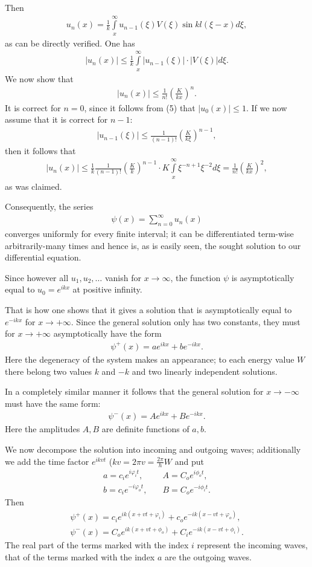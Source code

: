 \documentclass[a4paper,11pt]{article}
\newcommand{\?}[2]{#1\footnote{\textsc{Translator note}: #2}}
\newcommand{\nequ}[2]{\begin{align*}\tag{#1}#2\end{align*}}
\newcommand{\uequ}[1]{\begin{align*}#1\end{align*}}
\renewcommand{\exp}[1]{e^{#1}}
\begin{document}
Then
\uequ{
u_n(x) = \frac{1}{k}\int\limits_x^\infty u_{n-1}(\xi) V(\xi) \sin{kl(\xi - x)}d\xi,
}
as can be directly verified. One has
\uequ{
\left|u_n(x)\right| 
\leq 
\frac{1}{k}\int\limits_x^\infty
\left|u_{n-1}(\xi)\right|
\cdot
\left|V(\xi)\right|d\xi.
}
We now show that 
\uequ{
\left|u_n(x)\right| \leq \frac{1}{n!}\left(\frac{K}{kx}\right)^n.
}
It is correct for $n=0$, since it follows from (5) that $|u_0(x)|\leq 1$. If we now assume that it is correct for $n-1$:
\uequ{
\left|u_{n-1}(\xi)\right| \leq \frac{1}{(n-1)!}\left(\frac{K}{k\xi}\right)^{n-1},
}
then it follows that
\uequ{
\left|u_n(x)\right|\leq\frac{1}{k}\frac{1}{(n-1)!}\left(\frac{K}{k}\right)^{n-1}\cdot K
\int\limits_x^\infty\xi^{-n+1}\xi^{-2}d\xi = \frac{1}{n!}\left(\frac{K}{kx}\right)^2,
}
as was claimed.

Consequently, the series
\nequ{6}{
\psi(x) = \sum\limits_{n=0}^\infty u_n(x)
}
converges uniformly for every finite interval; it can be differentiated term-wise arbitrarily-many times and hence is, as is easily seen, the sought solution to our differential equation.

Since however all $u_1, u_2, \dots$ vanish for $x\to\infty$, the function $\psi$ is asymptotically equal to $u_0 = \exp{ikx}$ at positive infinity.

That is how one shows that it gives a solution that is asymptotically equal to $\exp{-ikx}$ for $x\to +\infty$. Since the general solution only has two constants, they must for $x\to +\infty$ asymptotically have the form
\nequ{7}{\psi^+(x)=a\exp{ikx}+b\exp{-ikx}.}
Here the degeneracy of the system makes an appearance; to each energy value $W$ there belong two values $k$ and $-k$ and two linearly independent solutions.

In a completely similar manner it follows that the general solution for  $x\to-\infty$ must have the same form:
\nequ{8}{\psi^-(x)=A\exp{ikx}+B\exp{-ikx}.}
Here the amplitudes $A, B$ are definite functions of $a,b$.

We now decompose the solution into incoming and outgoing waves; additionally we add the time factor $\exp{ikvt}$ ($kv=2\pi v = \frac{2\pi}{h}W$ and put
\nequ{9}{
a = c_i \exp{i\varphi_i t}, \quad & A = C_o \exp{i\phi_o t},\\
b = c_i \exp{-i\varphi_o t}, \quad & B = C_o \exp{-i\phi_i t}.
}
Then
\nequ{10}{
\psi^+(x) = c_i \exp{ik(x+vt+\varphi_i)} + c_o \exp{-ik(x-vt+\varphi_o)},\\
\psi^-(x) = C_o \exp{ik(x+vt+\phi_o)} + C_i \exp{-ik(x-vt+\phi_i)}.
}
The real part of the terms marked with the index $i$ represent the incoming waves, that of the terms marked with the index $a$ are the outgoing waves.
\end{document}
